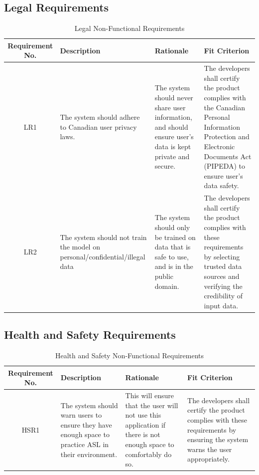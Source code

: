 \documentclass[12pt, titlepage]{article}
\begin{document}
\subsection{Legal Requirements}

\begin{table}[H]
\caption{Legal Non-Functional Requirements}
\noindent \begin{tabular}{| c | p{3cm}| p{3cm}| p{3cm}|}
\hline 
\textbf{Requirement No.} & \textbf{Description} & \textbf{Rationale} & \textbf{Fit Criterion}\\
\hline
LR1 & The system should adhere to Canadian user privacy laws. &  The system should never share user information, and should ensure user's data is kept private and secure. & The developers shall certify the product complies with the Canadian Personal Information Protection and Electronic Documents Act (PIPEDA) to ensure user's data safety. \\
\hline
LR2 & The system should not train the model on personal/confidential/illegal data & The system should only be trained on data that is safe to use, and is in the public domain. & The developers shall certify the product complies with these requirements by selecting trusted data sources and verifying the credibility of input data. \\
\bottomrule
\end{tabular}
\end{table}

\subsection{Health and Safety Requirements}

\begin{table}[H]
\caption{Health and Safety Non-Functional Requirements}
\noindent \begin{tabular}{| c | p{3cm}| p{3cm}| p{3cm}|}
\hline 
\textbf{Requirement No.} & \textbf{Description} & \textbf{Rationale} & \textbf{Fit Criterion}\\
\hline
HSR1 & The system should warn users to ensure they have enough space to practice ASL in their environment. & This will ensure that the user will not use this application if there is not enough space to comfortably do so. & The developers shall certify the product complies with these requirements by ensuring the system warns the user appropriately. \\
\bottomrule
\end{tabular}
\end{table}
\end{document}
